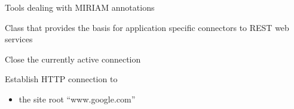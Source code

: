 \documentclass[letterpaper,10pt,english]{sphinxmanual}
\begin{document}

\begin{fulllineitems}
\label{\detokenize{modules_doc:cbmpy.CBNetDB.MIRIAMTools}}
\pysigstartsignatures
{}
\pysigstopsignatures
\sphinxAtStartPar
Tools dealing with MIRIAM annotations

\end{fulllineitems}


\begin{fulllineitems}
\label{\detokenize{modules_doc:cbmpy.CBNetDB.RESTClient}}
\pysigstartsignatures
{}
\pysigstopsignatures
\sphinxAtStartPar
Class that provides the basis for application specific connectors to REST web services

\begin{fulllineitems}
\label{\detokenize{modules_doc:cbmpy.CBNetDB.RESTClient.Close}}
\pysigstartsignatures
{}
\pysigstopsignatures
\sphinxAtStartPar
Close the currently active connection

\end{fulllineitems}


\begin{fulllineitems}
\label{\detokenize{modules_doc:cbmpy.CBNetDB.RESTClient.Connect}}
\pysigstartsignatures
{}
\pysigstopsignatures
\sphinxAtStartPar
Establish HTTP connection to
\begin{itemize}
\item {} 
\sphinxAtStartPar
{} the site root “www.google.com”

\end{itemize}

\end{fulllineitems}


\end{fulllineitems}
\end{document}
